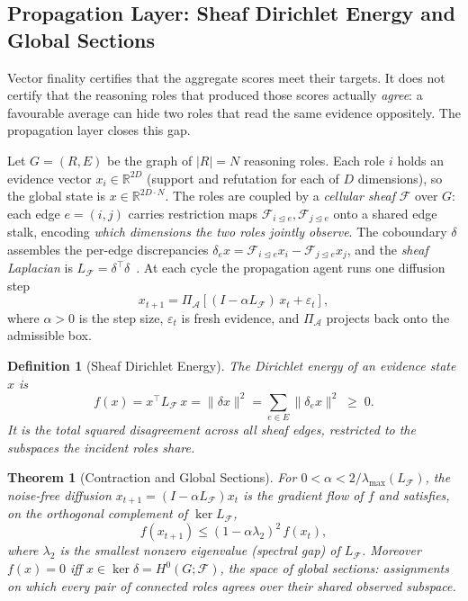\documentclass[11pt]{article}
\newtheorem{definition}{Definition}
\newtheorem{theorem}{Theorem}
\begin{document}
\subsection{Propagation Layer: Sheaf Dirichlet Energy and Global Sections}
\label{sec:propagation-layer}

Vector finality certifies that the aggregate scores meet their targets. It does not certify that the reasoning roles that produced those scores actually \emph{agree}: a favourable average can hide two roles that read the same evidence oppositely. The propagation layer closes this gap.

Let $G = (R, E)$ be the graph of $|R| = N$ reasoning roles. Each role $i$ holds an evidence vector $x_i \in \mathbb{R}^{2D}$ (support and refutation for each of $D$ dimensions), so the global state is $x \in \mathbb{R}^{2D \cdot N}$. The roles are coupled by a \emph{cellular sheaf} $\mathcal{F}$ over $G$: each edge $e = (i,j)$ carries restriction maps $\mathcal{F}_{i\trianglelefteq e}, \mathcal{F}_{j\trianglelefteq e}$ onto a shared edge stalk, encoding \emph{which dimensions the two roles jointly observe}. The coboundary $\delta$ assembles the per-edge discrepancies $\delta_e x = \mathcal{F}_{i\trianglelefteq e} x_i - \mathcal{F}_{j\trianglelefteq e} x_j$, and the \emph{sheaf Laplacian} is $L_{\mathcal{F}} = \delta^\top \delta$~\cite{ghrist2022}. At each cycle the propagation agent runs one diffusion step
\[
x_{t+1} = \Pi_{\mathcal{A}}\!\left[(I - \alpha L_{\mathcal{F}})\, x_t + \varepsilon_t\right],
\]
where $\alpha > 0$ is the step size, $\varepsilon_t$ is fresh evidence, and $\Pi_{\mathcal{A}}$ projects back onto the admissible box.

\begin{definition}[Sheaf Dirichlet Energy]
\label{def:dirichlet}
The Dirichlet energy of an evidence state $x$ is
\[
f(x) = x^\top L_{\mathcal{F}}\, x = \|\delta x\|^2 = \sum_{e \in E} \|\delta_e x\|^2 \; \geq \; 0 .
\]
It is the total squared disagreement across all sheaf edges, restricted to the subspaces the incident roles share.
\end{definition}

\begin{theorem}[Contraction and Global Sections]
\label{thm:dirichlet-contraction}
For $0 < \alpha < 2/\lambda_{\max}(L_{\mathcal{F}})$, the noise-free diffusion $x_{t+1} = (I - \alpha L_{\mathcal{F}}) x_t$ is the gradient flow of $f$ and satisfies, on the orthogonal complement of $\ker L_{\mathcal{F}}$,
\[
f(x_{t+1}) \leq (1 - \alpha \lambda_2)^2\, f(x_t),
\]
where $\lambda_2$ is the smallest nonzero eigenvalue (spectral gap) of $L_{\mathcal{F}}$. Moreover $f(x) = 0$ iff $x \in \ker \delta = H^0(G;\mathcal{F})$, the space of \emph{global sections}: assignments on which every pair of connected roles agrees over their shared observed subspace.
\end{theorem}
\end{document}
